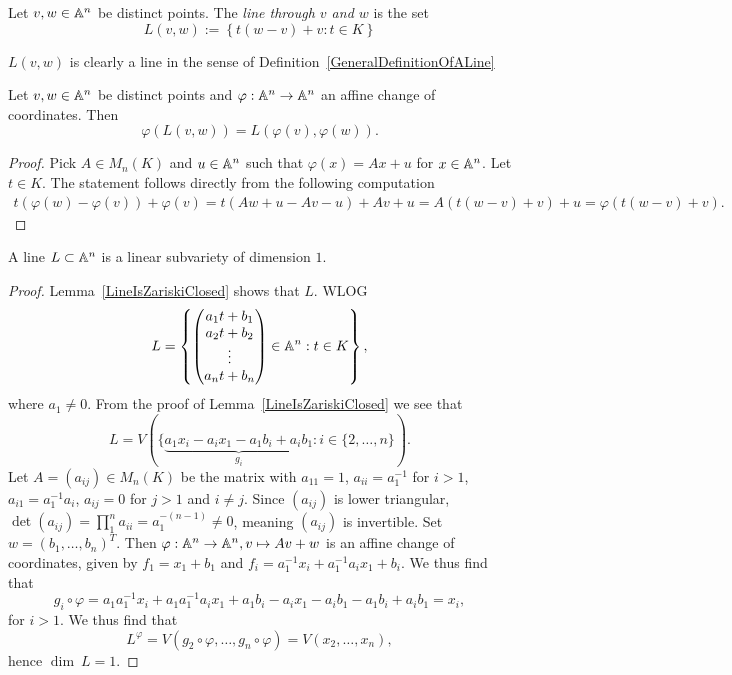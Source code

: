 \begin{definition}
    Let $v,w\in\mathbb{A}^n$ be distinct points. The \textit{line through $v$ and $w$} is the set 
    $$L(v,w):=\left\{t(w-v)+v : t \in K \right\} $$
\end{definition}
\begin{remark}
    $L(v,w)$ is clearly a line in the sense of Definition~\ref{GeneralDefinitionOfALine}
\end{remark}
\begin{lemma}\label{ChangeOfCoordinatesOfLine}
    Let $v,w\in\mathbb{A}^n$ be distinct points and $\varphi:\mathbb{A}^n\rightarrow\mathbb{A}^n$ an affine change of coordinates. Then $$\varphi(L(v,w))=L(\varphi(v),\varphi(w)).$$
\end{lemma}
\begin{proof}
    Pick $A\in M_n(K)$ and $u\in \mathbb{A}^n$ such that $\varphi(x) = Ax+u$ for $x\in \mathbb{A}^n$. Let $t\in K$. The statement follows directly from the following computation
    \begin{align*}
        t(\varphi(w)-\varphi(v))+\varphi(v)= t(Aw+u-Av-u)+Av+u = A(t(w-v)+v)+u=\varphi(t(w-v)+v).
    \end{align*}
\end{proof}
\begin{lemma}\label{LineIsOneDimensional}
    A line $L\subset \mathbb{A}^n$ is a linear subvariety of dimension $1$.
\end{lemma}
\begin{proof}
    Lemma~\ref{LineIsZariskiClosed} shows that $L$. WLOG 
    $$L=\left\{ \begin{pmatrix} a_1t+b_1\\ a_2t+b_2\\ \vdots \\ a_nt+b_n \end{pmatrix}\in\mathbb{A}^n : t \in K \right\},$$
    where $a_1\neq0$.
    From the proof of Lemma~\ref{LineIsZariskiClosed} we see that 
    $$L= V(\{\underbrace{a_1x_i - a_ix_1-a_1b_i+a_ib_1}_{g_i} : i\in\{2,\dots,n\}).$$
    Let $A=(a_{ij})\in M_n(K)$ be the matrix with $a_{11}=1$, $a_{ii} = a_1^{-1}$ for $i>1$, $a_{i1}=a_1^{-1}a_i$, $a_{ij}=0$ for $j>1$ and $i\neq j$. Since $(a_{ij})$ is lower triangular, $\det (a_{ij})=\prod_1^n a_{ii}=a_1^{-(n-1)}\neq 0$, meaning $(a_{ij})$ is invertible. Set $w = (b_1,\dots,b_n)^T$. Then $\varphi: \mathbb{A}^n \rightarrow \mathbb{A}^n, v\mapsto Av+w$ is an affine change of coordinates, given by $f_1=x_1+b_1$ and $f_i = a_1^{-1}x_i+a_1^{-1}a_ix_1+b_i$. We thus find that 
    $$g_i\circ \varphi = a_1a_1^{-1}x_i+a_1a_1^{-1}a_ix_1+a_1b_i-a_ix_1-a_ib_1-a_1b_i+a_ib_1 = x_i,$$
    for $i>1$. We thus find that 
    $$L^\varphi = V(g_2\circ \varphi ,\dots, g_n\circ \varphi)= V(x_2,\dots,x_n),$$
    hence $\dim \ L = 1$.
\end{proof}
